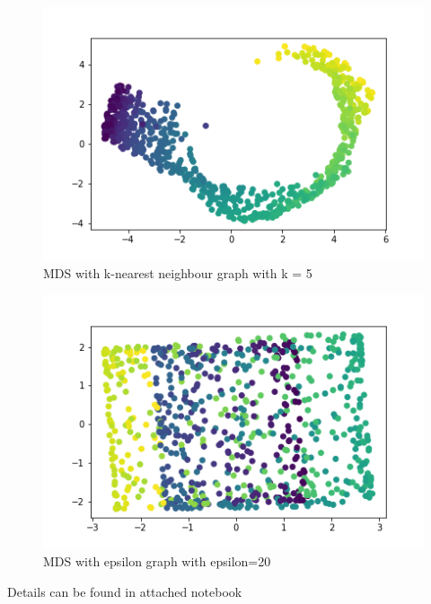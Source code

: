 \begin{figure}[h]
    \includegraphics[width=1\textwidth]{k.png}
    \caption{MDS with k-nearest neighbour graph with k = 5}
 \end{figure}
\newpage
\begin{figure}[h]
    \includegraphics[width=1\textwidth]{epsilon.png}
    \caption{MDS with epsilon graph with epsilon=20}
\end{figure}
 Details can be found in attached notebook
